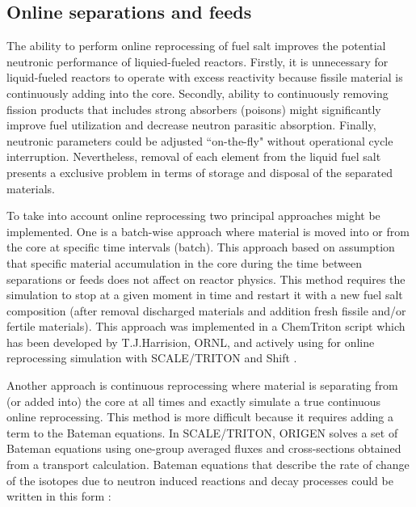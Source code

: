\subsection{Online separations and feeds}
The ability to perform online reprocessing of fuel salt improves the potential neutronic performance of liquied-fueled reactors. Firstly, it is unnecessary for liquid-fueled reactors to operate with excess reactivity because fissile material is continuously adding into the core. Secondly, ability to continuously removing fission products that includes strong absorbers (poisons) might significantly improve fuel utilization and decrease neutron parasitic absorption. Finally, neutronic parameters could be adjusted ``on-the-fly" without operational cycle interruption. Nevertheless, removal of each element from the liquid fuel salt presents a exclusive problem in terms of storage and disposal of the separated materials.

To take into account online reprocessing two principal approaches might be implemented. One is a batch-wise approach where material is moved into or from the core at specific time intervals (batch). This approach based on assumption that specific material accumulation in the core during the time between separations or feeds does not affect on reactor physics. This method requires the simulation to stop at a given moment in time and restart it with a new fuel salt composition (after removal discharged materials and addition fresh fissile and/or fertile materials). This approach was implemented in a ChemTriton script \cite{powers_new_2013} which has been developed by T.J.Harrision, \gls{ORNL}, and actively using for online reprocessing simulation with SCALE/TRITON \cite{bowman_scale_2011} and Shift \cite{pandya_implementation_2016}. 

Another approach is continuous reprocessing where material is separating from (or added into) the core at all times and exactly simulate a true continuous online reprocessing. This method is more difficult because it requires adding a term to the Bateman equations. In SCALE/TRITON, ORIGEN \cite{gauld_isotopic_2011} solves a set of Bateman equations using one-group averaged fluxes and cross-sections obtained from a transport calculation. Bateman equations that describe the rate of change of the isotopes due to neutron induced reactions and decay
processes could be written in this form \cite{aufiero_extended_2013}:

